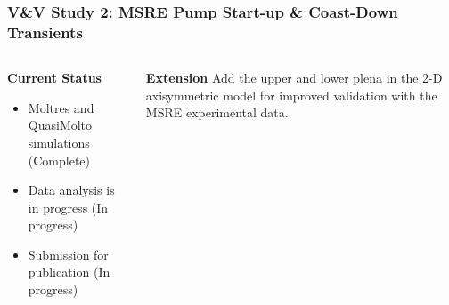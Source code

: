 \begin{frame}
  \frametitle{V\&V Study 2: MSRE Pump Start-up \& Coast-Down Transients}
  \begin{columns}
    \column[t]{6.5cm}
    \begin{block}{\textbf{Current Status}}
      \begin{itemize}
        \item Moltres and QuasiMolto simulations (Complete)
        \item Data analysis is in progress (In progress)
        \item Submission for publication (In progress)
      \end{itemize}
    \end{block}
    \begin{block}{\textbf{Extension}}
      Add the upper and lower plena in the 2-D axisymmetric model for improved validation with
      the MSRE experimental data.


\end{block}
\end{columns}
\end{frame}
